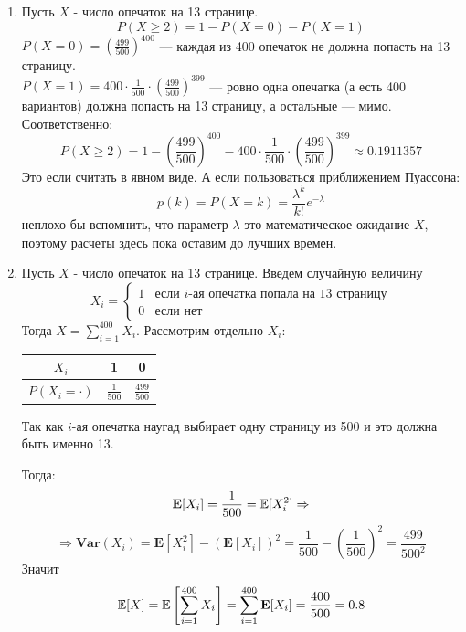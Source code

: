 \documentclass[12pt, a4paper]{article}\usepackage[]{graphicx}\usepackage[]{color}
\begin{document}
\begin{enumerate}
					\begin{enumerate}
						\item Пусть $X$ - число опечаток на 13 странице. $$P(X \geqslant 2) = 1 - P(X=0) - P(X=1) $$
						$P(X=0) = \left( \frac{499}{500} \right)^{400}$ — каждая из 400 опечаток не должна попасть на 13 страницу.\\
						$P(X=1) = 400\cdot\frac{1}{500}\cdot\left( \frac{499}{500} \right)^{399}$ — ровно одна опечатка (а есть 400 вариантов) должна попасть на 13 страницу, а остальные — мимо. Соответственно:
						$$
						P(X \geqslant 2) = 1 - \left( \frac{499}{500} \right)^{400} - 400\cdot\frac{1}{500}\cdot\left( \frac{499}{500} \right)^{399} \approx 0.1911357
						$$
						Это если считать в явном виде. А если пользоваться приближением Пуассона:
						$$
						p(k) = P(X = k) = \frac{\lambda^k}{k!}e^{-\lambda}
						$$
						неплохо бы вспомнить, что параметр $\lambda$ это математическое ожидание $X$, поэтому расчеты здесь пока оставим до лучших времен.

						\item Пусть $X$ - число опечаток на 13 странице. Введем случайную величину
						$$X_i =
						\begin{cases}
						1 & \text{если } i\text{-ая опечатка попала на 13 страницу}\\
						0 & \text{если нет}
						\end{cases}
						$$
						Тогда $X = \sum\limits_{i=1}^{400}X_i$. Рассмотрим отдельно $X_i$: \hspace{0.5cm}
						\begin{minipage}{0.3\linewidth}

							\begin{tabular}{c|c|c}
								$X_i$ & 1 & 0 \\
								\hline
								$P(X_i = \cdot)$ & $\frac{1}{500} $ & $\frac{499}{500}$
							\end{tabular}
						\end{minipage}


						Так как $i$-ая опечатка наугад выбирает одну страницу из 500 и это должна быть именно 13.

						Тогда:
						$$
						\mathbf{E}[X_i] = \frac{1}{500} = \mathbb{E}[X^2_i] \Rightarrow
						$$
						$$
						\Rightarrow \mathbf{Var}(X_i) = \mathbf{E}[X^2_i] - (\mathbf{E}[X_i])^2 = \frac{1}{500} - \left(\frac{1}{500}\right)^2 = \frac{499}{500^2}
						$$
						Значит
						$$
						\mathbb{E}[X] = \mathbb{E}\left[\sum\limits_{i=1}^{400}X_i\right] = \sum\limits_{i=1}^{400}\mathbf{E}[X_i]  = \frac{400}{500} = 0.8
						$$


\end{enumerate}
\end{enumerate}
\end{document}
